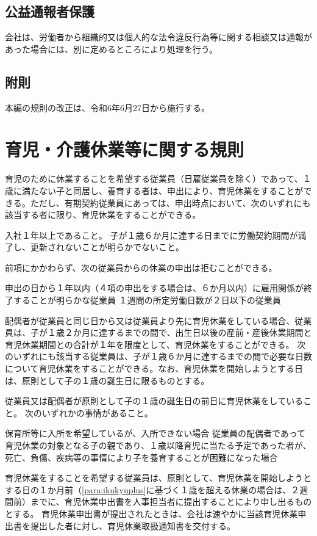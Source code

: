 \documentclass[10pt,a4paper,uplatex]{jsarticle}
\begin{document}
\subsection{公益通報者保護}

会社は、労働者から組織的又は個人的な法令違反行為等に関する相談又は通報があった場合には、別に定めるところにより処理を行う。

\subsection*{附則}
本編の規則の改正は、令和6年6月27日から施行する。



\clearpage
\section{育児・介護休業等に関する規則}

育児のために休業することを希望する従業員（日雇従業員を除く）であって、１歳に満たない子と同居し、養育する者は、申出により、育児休業をすることができる。ただし、有期契約従業員にあっては、申出時点において、次のいずれにも該当する者に限り、育児休業をすることができる。
\label{para:ChildcareLayoff}
\begin{enumerate}
    \itm 入社１年以上であること。
    \itm 子が１歳６か月に達する日までに労働契約期間が満了し、更新されないことが明らかでないこと。
\end{enumerate}
\term 前項にかかわらず、次の従業員からの休業の申出は拒むことができる。
\begin{enumerate}
    \itm 申出の日から１年以内（４項の申出をする場合は、６か月以内）に雇用関係が終了することが明らかな従業員
    \itm １週間の所定労働日数が２日以下の従業員
\end{enumerate}
\term 配偶者が従業員と同じ日から又は従業員より先に育児休業をしている場合、従業員は、子が１歳２か月に達するまでの間で、出生日以後の産前・産後休業期間と育児休業期間との合計が１年を限度として、育児休業をすることができる。
\label{para:ikukyuplus}
\term 次のいずれにも該当する従業員は、子が１歳６か月に達するまでの間で必要な日数について育児休業をすることができる。なお、育児休業を開始しようとする日は、原則として子の１歳の誕生日に限るものとする。
\begin{enumerate}
    \itm 従業員又は配偶者が原則として子の１歳の誕生日の前日に育児休業をしていること。
    \itm 次のいずれかの事情があること。
    \begin{enumerate}
        \itm 保育所等に入所を希望しているが、入所できない場合
        \itm 従業員の配偶者であって育児休業の対象となる子の親であり、１歳以降育児に当たる予定であった者が、死亡、負傷、疾病等の事情により子を養育することが困難になった場合
    \end{enumerate}
\end{enumerate}
\term 育児休業をすることを希望する従業員は、原則として、育児休業を開始しようとする日の１か月前（\ref{para:ikukyuplus}に基づく１歳を超える休業の場合は、２週間前）までに、育児休業申出書を人事担当者に提出することにより申し出るものとする。
\term 育児休業申出書が提出されたときは、会社は速やかに当該育児休業申出書を提出した者に対し、育児休業取扱通知書を交付する。
\end{document}
